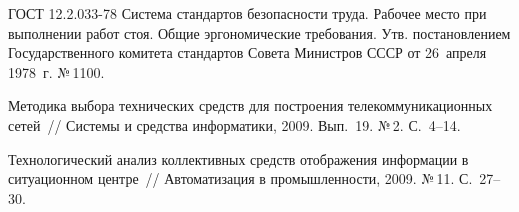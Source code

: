 \begin{multicols}{2}
{{\begin{thebibliography}{99}
ГОСТ 12.2.033-78 Система стандартов безопасности труда. Рабочее место 
при выполнении работ стоя. Общие эргономические требования. Утв. 
по\-ста\-нов\-ле\-ни\-ем Государственного комитета стандартов Совета 
Министров СССР от 26~апреля 1978~г. №\,1100.


Методика выбора технических средств для построения 
телекоммуникационных сетей~// Системы и средства информатики, 2009. 
Вып.~19. №\,2. С.~4--14.

\label{end\stat}

Технологический анализ коллективных средств отображения информации 
в ситуационном центре~// Автоматизация в промышленности, 2009. 
№\,11. С.~27--30.
 \end{thebibliography}
}
}

\end{multicols}